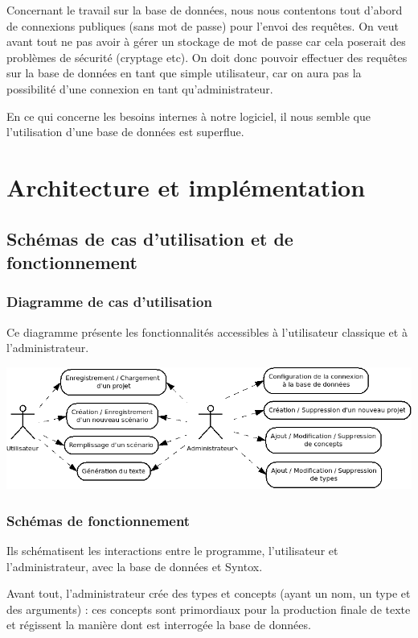 \documentclass[12pt]{report}
\begin{document}
Concernant le travail sur la base de données, nous nous contentons tout
d'abord de connexions publiques (sans mot de passe) pour l'envoi des
requêtes. On veut avant tout ne pas avoir à gérer un stockage de mot de
passe car cela poserait des problèmes de sécurité (cryptage etc).
On doit donc pouvoir effectuer des requêtes sur la base de données en
tant que simple utilisateur, car on aura pas la possibilité d'une
connexion en tant qu'administrateur.

En ce qui concerne les besoins internes à notre logiciel, il nous semble
que l'utilisation d'une base de données est superflue.  


\chapter{Architecture et implémentation}

\section{Schémas de cas d'utilisation et de fonctionnement}




\subsection{Diagramme de cas d'utilisation}

	Ce diagramme présente les fonctionnalités accessibles à l'utilisateur classique et à l'administrateur. \bigskip

	\includegraphics[scale=0.5]{cas_utilisation.png}

\subsection{Schémas de fonctionnement}

Ils schématisent les interactions entre le programme, l'utilisateur et l'administrateur, avec la base de données et Syntox.

Avant tout, l'administrateur crée des types et concepts (ayant un nom, un type et des arguments) : ces concepts sont primordiaux pour la production finale de texte et régissent la manière dont est interrogée la base de données.
\end{document}
